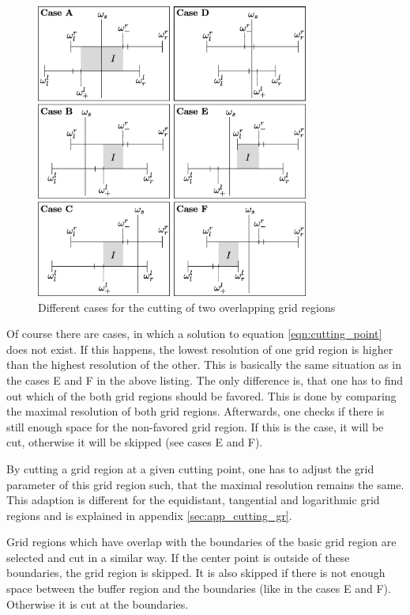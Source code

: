 \begin{figure}[h]
	\centering
	\includegraphics[width=0.8\textwidth]{pics/cutting_gr_cases.eps}
	\caption{Different cases for the cutting of two overlapping grid regions}
	\label{fig:cutting_gr_cases}
\end{figure}

Of course there are cases, in which a solution to equation \ref{eqn:cutting_point} does not exist. If this happens, the lowest resolution of one grid region is higher than the highest resolution of the other. This is basically the same situation as in the cases E and F in the above listing. The only difference is, that one has to find out which of the both grid regions should be favored. This is done by comparing the maximal resolution of both grid regions. Afterwards, one checks if there is still enough space for the non-favored grid region. If this is the case, it will be cut, otherwise it will be skipped  (see cases E and F).

By cutting a grid region at a given cutting point, one has to adjust the grid parameter of this grid region such, that the maximal resolution remains the same. This adaption is different for the equidistant, tangential and logarithmic grid regions and is explained in appendix \ref{sec:app_cutting_gr}.

Grid regions which have overlap with the boundaries of the basic grid region are selected and cut in a similar way. If the center point is outside of these boundaries, the grid region is skipped. It is also skipped if there is not enough space between the buffer region and the boundaries (like in the cases E and F). Otherwise it is cut at the boundaries.


